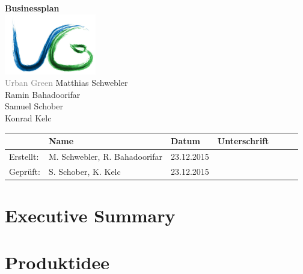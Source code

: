 \documentclass[11pt]{article}
\begin{document}
\begin{titlepage}
    \centering
    \vfill
    {
        \Huge\textbf{Businessplan}\\
        \vskip2cm
        \includegraphics[width=4cm]{logo} \\
        \Large 
        {\selectfont 
			\textcolor{gray}{Urban Green}%
		}
        \vskip3cm
        Matthias Schwebler\\
        Ramin Bahadoorifar\\
        Samuel Schober\\
        Konrad Kelc\\
    }    
    \vfill
    \begin{center}
    	\begin{tabu} to 
    		\hline
    		& Name & Datum & Unterschrift \\ \hline
    		Erstellt: & M. Schwebler, R. Bahadoorifar & 23.12.2015 & \\ \hline
    		Gepr\"uft: & S. Schober, K. Kelc & 23.12.2015 & \\ \hline
    	\end{tabu}
    \end{center}
    
    \vfill
    \vfill
\end{titlepage}

\section{Executive Summary}
\section{Produktidee}
\end{document}
